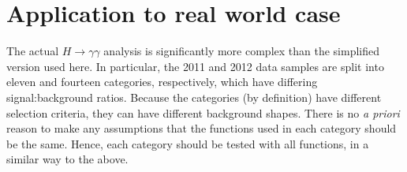 
\section{Application to real world case}
\label{sec:discussion}
\label{sec:discussion:higgs}


The actual $H \rightarrow \gamma\gamma$ analysis is significantly more
complex than the simplified version used here. In particular, the 2011 
and 2012 data
samples are split into eleven and fourteen categories, respectively, which have
differing signal:background ratios.
Because the categories (by definition) have different selection criteria,
they can have different background shapes.
There is no {\it a priori} reason to make any assumptions that the functions
used in each category should be the same. Hence, each category should be
tested with all functions, in a similar way to the above.

